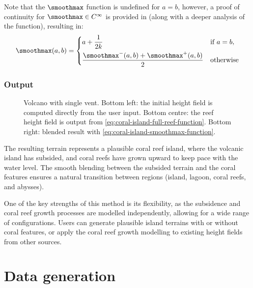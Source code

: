 Note that the $\smoothmax$ function is undefined for $a = b$, however, a proof of continuity for $\smoothmax \in C^\infty$ is provided in  (along with a deeper analysis of the function), resulting in:
\begin{align}
    \label{eq:coral-island-smoothmax-function}
    \smoothmax(a, b) = \begin{dcases}
        a + \frac{1}{2k} & \text{if } a = b, \\
        \frac{\smoothmax^-(a, b) + \smoothmax^+(a, b)}{2} & \text{otherwise}
    \end{dcases}
\end{align}

\subsubsection{Output}
\label{sec:coral-island-procedural-output}

\begin{figure}
    \caption{Volcano with single vent. Bottom left: the initial height field is computed directly from the user input. Bottom centre: the reef height field is output from \cref{eq:coral-island-full-reef-function}. Bottom right: blended result with \cref{eq:coral-island-smoothmax-function}.}
    \label{fig:coral-island-volcano-example}
\end{figure}

The resulting terrain represents a plausible coral reef island, where the volcanic island has subsided, and coral reefs have grown upward to keep pace with the water level. The smooth blending between the subsided terrain and the coral features ensures a natural transition between regions (island, lagoon, coral reefs, and abysses).

One of the key strengths of this method is its flexibility, as the subsidence and coral reef growth processes are modelled independently, allowing for a wide range of configurations. Users can generate plausible island terrains with or without coral features, or apply the coral reef growth modelling to existing height fields from other sources.

\section{Data generation}
\label{sec:coral-island-dataset-generation}

